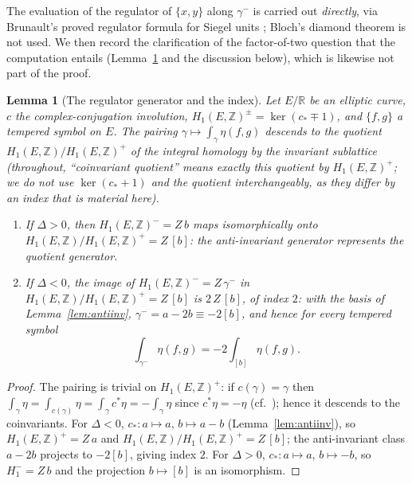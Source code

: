 \documentclass[preprint,12pt]{elsarticle}
\newtheorem{lemma}[theorem]{Lemma}
\theoremstyle{definition}
\theoremstyle{remark}
\newcommand{\Z}{\mathbb{Z}}
\newcommand{\R}{\mathbb{R}}
\begin{document}
The evaluation of the regulator of $\{x,y\}$ along $\gamma^-$ is carried out
\emph{directly}, via Brunault's proved regulator formula for Siegel units
\cite{BrunaultSiegel}; Bloch's diamond theorem is not used.  We then record
the clarification of the factor-of-two question that the computation
entails (Lemma~\ref{lem:coinvariant} and the discussion below), which is
likewise not part of the proof.

\begin{lemma}[The regulator generator and the index]\label{lem:coinvariant}
Let $E/\R$ be an elliptic curve, $c$ the complex-conjugation involution,
$H_1(E,\Z)^\pm=\ker(c_*\mp1)$, and $\{f,g\}$ a tempered symbol on $E$.
The pairing $\gamma\mapsto\int_\gamma\eta(f,g)$ descends to the quotient
$H_1(E,\Z)/H_1(E,\Z)^+$ of the integral homology by the invariant
sublattice (throughout, ``coinvariant quotient'' means exactly this
quotient by $H_1(E,\Z)^+$; we do not use $\ker(c_*+1)$ and the quotient
interchangeably, as they differ by an index that is material here).
\begin{enumerate}
  \item If $\Delta>0$, then $H_1(E,\Z)^-=Z\,b$ maps isomorphically onto
  $H_1(E,\Z)/H_1(E,\Z)^+=Z\,[b]$: the anti-invariant generator represents
  the quotient generator.
  \item If $\Delta<0$, the image of $H_1(E,\Z)^-=Z\,\gamma^-$ in
  $H_1(E,\Z)/H_1(E,\Z)^+=Z\,[b]$ is $2\,Z\,[b]$, of index $2$: with the
  basis of Lemma~\ref{lem:antiinv}, $\gamma^-=a-2b\equiv-2[b]$, and hence
  for every tempered symbol
  \[
    \int_{\gamma^-}\eta(f,g)=-2\int_{[b]}\eta(f,g).
  \]
\end{enumerate}
\end{lemma}

\begin{proof}
The pairing is trivial on $H_1(E,\Z)^+$: if $c(\gamma)=\gamma$ then
$\int_\gamma\eta=\int_{c(\gamma)}\eta=\int_\gamma c^*\eta=-\int_\gamma\eta$
since $c^*\eta=-\eta$ (cf.\ \cite[Rem.~4]{LalinRam}); hence it descends to
the coinvariants.  For $\Delta<0$, $c_*:a\mapsto a$, $b\mapsto a-b$
(Lemma~\ref{lem:antiinv}), so $H_1(E,\Z)^+=Z\,a$ and
$H_1(E,\Z)/H_1(E,\Z)^+=Z\,[b]$; the anti-invariant class $a-2b$ projects
to $-2[b]$, giving index $2$.  For $\Delta>0$, $c_*:a\mapsto a$,
$b\mapsto-b$, so $H_1^-=Z\,b$ and the projection $b\mapsto[b]$ is an
isomorphism.
\end{proof}
\end{document}
